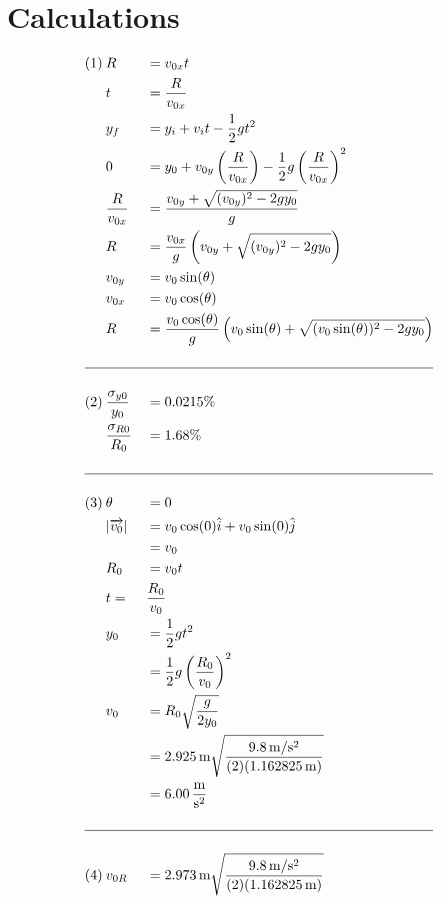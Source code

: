 \documentclass[12pt]{article}
\begin{document}
    \section{Calculations}
    \begin{alignat*}{3}
        (1) \> &R &&= v_{0x} t \\
        &t &&= \frac{R}{v_{0x}} \\
        &y_{f} &&= y_i + v_it-\frac{1}{2}gt^2 \\
        &0 &&= y_0 + v_{0y}\left(\frac{R}{v_{0x}}\right) - \frac{1}{2}g \left(\frac{R}{v_{0x}}\right)^2\\
        &\frac{R}{v_{0x}} &&= \frac{v_{0y}+\sqrt{(v_{0y})^2-2gy_{0}}}{g}\\
        &R &&= \frac{v_{0x}}{g}\left(v_{0y}+\sqrt{(v_{0y})^2-2gy_{0}}\right)\\
        &v_{0y} &&= v_0 \sin(\theta)\\
        &v_{0x} && = v_0 \cos(\theta)\\
        &R &&= \frac{v_0 \cos(\theta)}{g}\left(v_0 \sin(\theta) +\sqrt{(v_0 \sin(\theta))^2-2gy_{0}}\right)\\\\
        \hline\\
        (2) \> &\frac{\sigma_{y0}}{y_0} && = 0.0215\%\\
        &\frac{\sigma_{R0}}{R_0} && = 1.68\%\\\\
        \hline\\
        (3) \> &\theta && = 0\\
        &|\overrightarrow{v_0}| && = v_0\cos(0)\hat{i}+v_0\sin(0)\hat{j}\\
        &&&=v_0\\
        &R_0 &&= v_0t\\
        &t = &&\frac{R_0}{v_0}\\
        &y_0 && = \frac{1}{2}gt^2\\
        &&& = \frac{1}{2}g\left(\frac{R_0}{v_0}\right)^2\\
        &v_0 && = R_0\sqrt{\frac{g}{2y_0}}\\
        &&& = 2.925 \, \text{m} \sqrt{\frac{9.8\, \mathrm{m/s^{2}} }{(2)( 1.162825\,\mathrm{m})}}\\
        &&& = 6.00 \,\mathrm{\frac{m}{s^2}}\\\\
        \hline\\
        (4)\>& v_{0R} && = 2.973 \, \text{m} \sqrt{\frac{9.8\, \mathrm{m/s^{2}} }{(2)( 1.162825\,\mathrm{m})}}\\

\end{alignat*}
\end{document}
